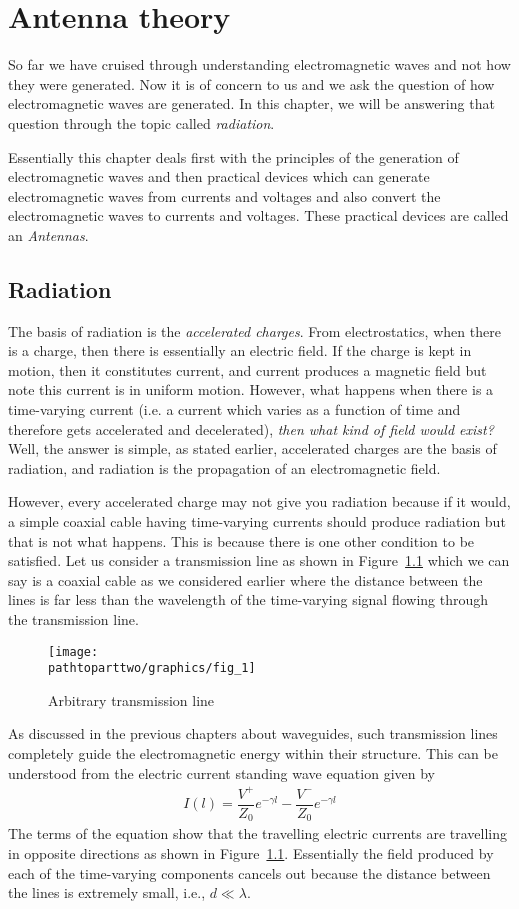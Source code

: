 \chapter{Antenna theory}
So far we have cruised through understanding electromagnetic waves and not how they were generated. Now it is of concern to us and we ask the question of how electromagnetic waves are generated. In this chapter, we will be answering that question through the topic called \emph{radiation}. 

Essentially this chapter deals first with the principles of the generation of electromagnetic waves and then practical devices which can generate electromagnetic waves from currents and voltages and also convert the electromagnetic waves to currents and voltages. These practical devices are called an \emph{Antennas}.

\section{Radiation}
The basis of radiation is the \emph{accelerated charges}. From electrostatics, when there is a charge, then there is essentially an electric field. If the charge is kept in motion, then it constitutes current, and current produces a magnetic field but note this current is in uniform motion. However, what happens when there is a time-varying current (i.e. a current which varies as a function of time and therefore gets accelerated and decelerated), \emph{then what kind of field would exist?} Well, the answer is simple, as stated earlier, accelerated charges are the basis of radiation, and radiation is the propagation of an electromagnetic field.

However, every accelerated charge may not give you radiation because if it would, a simple coaxial cable having time-varying currents should produce radiation but that is not what happens. This is because there is one other condition to be satisfied. Let us consider a transmission line as shown in Figure~\ref{fig:txnsline} which we can say is a coaxial cable as we considered earlier where the distance between the lines is far less than the wavelength of the time-varying signal flowing through the transmission line.
\begin{figure}[h]
\centering
\texttt{[image: \\pathtoparttwo/graphics/fig\_1]}
\caption{Arbitrary transmission line}
\label{fig:txnsline}
\end{figure}

As discussed in the previous chapters about waveguides, such transmission lines completely guide the electromagnetic energy within their structure. This can be understood from the electric current standing wave equation given by
\begin{align*}
I(l)=\dfrac{V^+}{Z_0}e^{-\gamma l} - \dfrac{V^-}{Z_0}e^{-\gamma l}
\end{align*}
The terms of the equation show that the travelling electric currents are travelling in opposite directions as shown in Figure~\ref{fig:txnsline}. Essentially the field produced by each of the time-varying components cancels out because the distance between the lines is extremely small, i.e., $d\ll\lambda$. 

